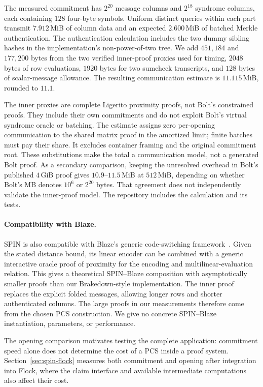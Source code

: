 The measured commitment has $2^{20}$ message columns and $2^{18}$
syndrome columns, each containing $128$ four-byte symbols.
Uniform distinct queries within each part transmit $7.912$\,MiB of
column data and an expected $2.600$\,MiB of batched Merkle authentication.
The authentication calculation includes the two dummy sibling hashes in
the implementation's non-power-of-two tree.
We add $451{,}184$ and $177{,}200$ bytes from the two verified inner-proof
proxies used for timing, $2048$ bytes of row evaluations, $1920$ bytes for
two sumcheck transcripts, and $128$ bytes of scalar-message allowance.
The resulting communication estimate is $11.115$\,MiB, rounded to $11.1$.

The inner proxies are complete Ligerito proximity proofs, not Bolt's
constrained proofs. They include their own commitments and do not exploit
Bolt's virtual syndrome oracle or batching. The estimate assigns zero
per-opening communication to the shared matrix proof in the amortized
limit; finite batches must pay their share. It excludes container framing
and the original commitment root. These substitutions make the total a
communication model, not a generated Bolt proof.
As a secondary comparison, keeping the unresolved overhead in Bolt's
published $4$\,GiB proof gives $10.9$--$11.5$\,MiB at $512$\,MiB,
depending on whether Bolt's MB denotes $10^6$ or $2^{20}$ bytes. That
agreement does not independently validate the inner-proof model. The
repository includes the calculation and its tests\repositorycite.

\paragraph{Compatibility with Blaze.}
SPIN is also compatible with Blaze's generic code-switching
framework~\cite{blaze25}. Given the stated distance bound, its linear
encoder can be combined with a generic interactive oracle proof of
proximity for the encoding and multilinear-evaluation relation. This
gives a theoretical SPIN--Blaze composition with asymptotically smaller
proofs than our Brakedown-style implementation. The inner proof replaces
the explicit folded messages, allowing longer rows and shorter
authenticated columns. The large proofs in our measurements therefore
come from the chosen PCS construction. We give no concrete SPIN--Blaze
instantiation, parameters, or performance.

The opening comparison motivates testing the complete application:
commitment speed alone does not determine the cost of a PCS inside a
proof system. Section~\ref{sec:spin-flock} measures both commitment and
opening after integration into Flock, where the claim interface and
available intermediate computations also affect their cost.
